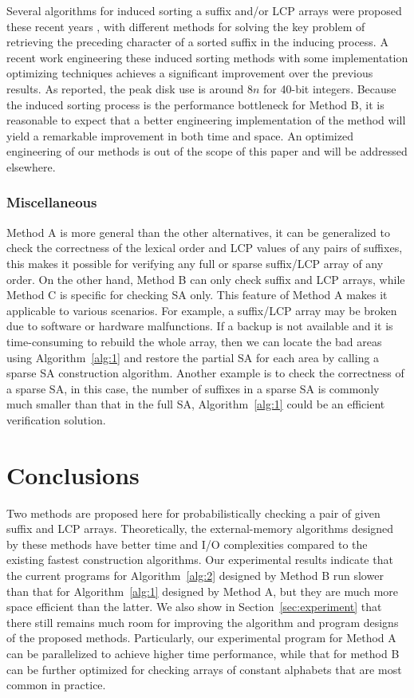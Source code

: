 \documentclass[10pt,journal,compsoc]{IEEEtran}
\begin{document}
Several algorithms for induced sorting a suffix and/or LCP arrays were proposed these recent years \cite{Nong15,Nong14,Bingmann12}, with different methods for solving the key problem of retrieving the preceding character of a sorted suffix in the inducing process. A recent work \cite{Karkkainen2017} engineering these induced sorting methods with some implementation optimizing techniques achieves a significant improvement over the previous results. As reported, the peak disk use is around $8n$ for 40-bit integers. Because the induced sorting process is the performance bottleneck for Method B, it is reasonable to expect that a better engineering implementation of the method will yield a remarkable improvement in both time and space. An optimized engineering of our methods is out of the scope of this paper and will be addressed elsewhere.

\subsubsection{Miscellaneous}
	
Method A is more general than the other alternatives, it can be generalized to check the correctness of the lexical order and LCP values of any pairs of suffixes, this makes it possible for verifying any full or sparse suffix/LCP array of any order. On the other hand, Method B can only check suffix and LCP arrays, while Method C is specific for checking SA only. This feature of Method A makes it applicable to various scenarios. For example, a suffix/LCP array may be broken due to software or hardware malfunctions. If a backup is not available and it is time-consuming to rebuild the whole array, then we can locate the bad areas using Algorithm~\ref{alg:1} and restore the partial SA for each area by calling a sparse SA construction algorithm. Another example is to check the correctness of a sparse SA, in this case, the number of suffixes in a sparse SA is commonly much smaller than that in the full SA, Algorithm~\ref{alg:1} could be an efficient verification solution.

\section{Conclusions} \label{sec:conclusion}

Two methods are proposed here for probabilistically checking a pair of given suffix and LCP arrays. Theoretically, the external-memory algorithms designed by these methods have better time and I/O complexities compared to the existing fastest construction algorithms. Our experimental results indicate that the current programs for Algorithm~\ref{alg:2} designed by Method B run slower than that for Algorithm~\ref{alg:1} designed by Method A, but they are much more space efficient than the latter. We also show in Section~\ref{sec:experiment} that there still remains much room for improving the algorithm and program designs of the proposed methods. Particularly, our experimental program for Method A can be parallelized to achieve higher time performance, while that for method B can be further optimized for checking arrays of constant alphabets that are most common in practice.
\end{document}
